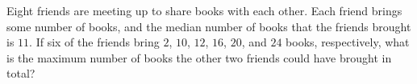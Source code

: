Eight friends are meeting up to share books with each other. Each friend brings some number of books, and the median number of books that the friends brought is $11$. If six of the friends bring $2$, $10$, $12$, $16$, $20$, and $24$ books, respectively, what is the maximum number of books the other two friends could have brought in total?
